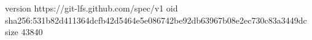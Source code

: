 version https://git-lfs.github.com/spec/v1
oid sha256:531b82d411364dcfb42d5464e5e086742be92db63967b08e2ec730c83a3449dc
size 43840

